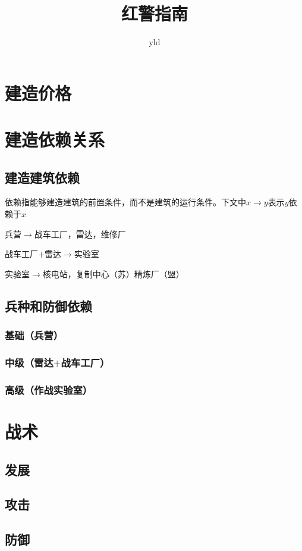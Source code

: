 \documentclass[12pt]{ctexart}
\title{红警指南}
\author{yld}
\date{}
\begin{document}
	\maketitle
	\newpage
	
	\section{建造价格}
		
	\newpage
	
	\section{建造依赖关系}
		\subsection{建造建筑依赖}
			依赖指能够建造建筑的前置条件，而不是建筑的运行条件。下文中$x \rightarrow y$表示$y$依赖于$x$
			
			兵营$\rightarrow$战车工厂，雷达，维修厂
			
			战车工厂$+$雷达$\rightarrow$实验室
			
			实验室$\rightarrow$核电站，复制中心（苏）精炼厂（盟）
		\subsection{兵种和防御依赖}
		\subsubsection{基础（兵营）}
		\subsubsection{中级（雷达$+$战车工厂）}
		\subsubsection{高级（作战实验室）}
	\newpage
	
	\section{战术}
		\subsection{发展}
		\subsection{攻击}
		\subsection{防御}
\end{document}

